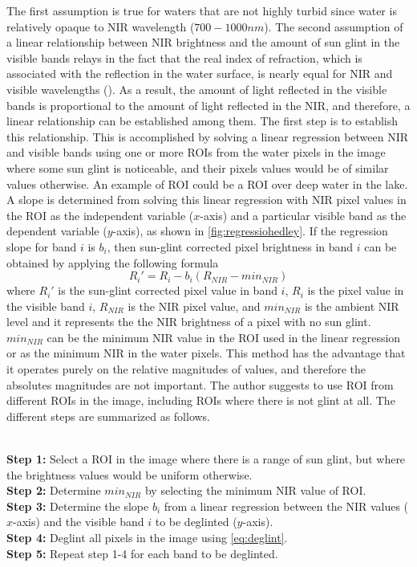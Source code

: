 The first assumption is true for waters that are not highly turbid since water is relatively opaque to NIR wavelength ($700-1000nm$). The second assumption of a linear relationship between NIR brightness and the amount of sun glint in the visible bands relays in the fact that the real index of refraction, which is associated with the reflection in the water surface, is nearly equal for NIR and visible wavelengths (\cite{Mobley1994}). As a result, the amount of light reflected in the visible bands is proportional to the amount of light reflected in the NIR, and therefore, a linear relationship can be established among them. The first step is to establish this relationship. This is accomplished by solving a linear regression between NIR and visible bands using one or more ROIs from the water pixels in the image where some sun glint is noticeable, and their pixels values would be of similar values otherwise. An example of ROI could be a ROI over deep water in the lake. A slope is determined from solving this linear regression with NIR pixel values in the ROI as the independent variable ($x$-axis) and a particular visible band as the dependent variable ($y$-axis), as shown in \autoref{fig:regressiohedley}. If the regression slope for band $i$ is $b_i$, then sun-glint corrected pixel brightness in band $i$ can be obtained by applying the following formula
\begin{equation}\label{eq:deglint}
  R_i' = R_i - b_i(R_{NIR}-min_{NIR})
\end{equation}
where $R_i'$ is the sun-glint corrected pixel value in band $i$, $R_i$ is the pixel value in the visible band $i$, $R_{NIR}$ is the NIR pixel value, and $min_{NIR}$ is the ambient NIR level and it represents the the NIR brightness of a pixel with no sun glint. $min_{NIR}$ can be the minimum NIR value in the ROI used in the linear regression or as the minimum NIR in the water pixels. This method has the advantage that it operates purely on the relative magnitudes of values, and therefore the absolutes magnitudes are not important. The author suggests to use ROI from different ROIs in the image, including ROIs where there is not glint at all. The different steps are summarized as follows.

\\
{\bf Step 1:} Select a ROI in the image where there is a range of sun glint, but where the brightness values would be uniform otherwise.\\
{\bf Step 2:} Determine $min_{NIR}$ by selecting the minimum NIR value of ROI.\\
{\bf Step 3:} Determine the slope $b_i$ from a linear regression between the NIR values ($x$-axis) and the visible band $i$ to be deglinted ($y$-axis).\\
{\bf Step 4:} Deglint all pixels in the image using \autoref{eq:deglint}.\\
{\bf Step 5:} Repeat step 1-4 for each band to be deglinted.

